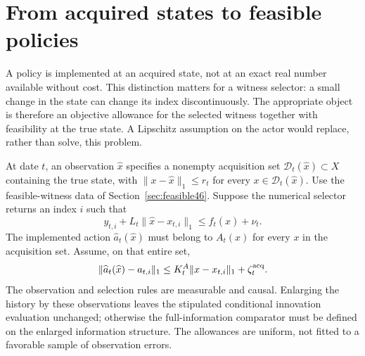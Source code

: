 \section{From acquired states to feasible policies}\label{sec:acquired47}
A policy is implemented at an acquired state, not at an exact real number available without cost. This distinction matters for a witness selector: a small change in the state can change its index discontinuously. The appropriate object is therefore an objective allowance for the selected witness together with feasibility at the true state. A Lipschitz assumption on the actor would replace, rather than solve, this problem.

At date $t$, an observation $\widehat x$ specifies a nonempty acquisition set $\mathcal D_t(\widehat x)\subset X$ containing the true state, with $\|x-\widehat x\|_1\le r_t$ for every $x\in\mathcal D_t(\widehat x)$. Use the feasible-witness data of Section~\ref{sec:feasible46}. Suppose the numerical selector returns an index $i$ such that
\begin{equation}\label{eq:index47}
 y_{t,i}+L_t\|\widehat x-x_{t,i}\|_1\le f_t(\widehat x)+\nu_t.
\end{equation}
The implemented action $\widehat a_t(\widehat x)$ must belong to $A_t(x)$ for every $x$ in the acquisition set. Assume, on that entire set,
\begin{equation}\label{eq:robustrepair47}
 \|\widehat a_t(\widehat x)-a_{t,i}\|_1
 \le K_t^A\|x-x_{t,i}\|_1+\zeta_t^{\rm acq}.
\end{equation}
The observation and selection rules are measurable and causal. Enlarging the history by these observations leaves the stipulated conditional innovation evaluation unchanged; otherwise the full-information comparator must be defined on the enlarged information structure. The allowances are uniform, not fitted to a favorable sample of observation errors.

